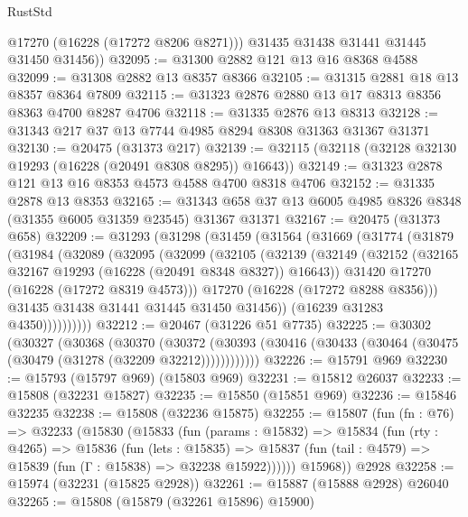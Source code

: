 \begin{lexlean}{RustStd}
\begin{coremodule}
          @17270
          (@16228 (@17272 @8206 @8271)))
        @31435
        @31438
        @31441
        @31445
        @31450
        @31456))
@32095 := @31300 @2882 @121 @13 @16 @8368 @4588
@32099 := @31308 @2882 @13 @8357 @8366
@32105 := @31315 @2881 @18 @13 @8357 @8364 @7809
@32115 := @31323 @2876 @2880 @13 @17 @8313 @8356 @8363 @4700 @8287 @4706
@32118 := @31335 @2876 @13 @8313
@32128 := @31343 @217 @37 @13 @7744 @4985 @8294 @8308 @31363 @31367 @31371
@32130 := @20475 (@31373 @217)
@32139 := @32115 (@32118 (@32128 @32130 @19293 (@16228 (@20491 @8308 @8295)) @16643))
@32149 := @31323 @2878 @121 @13 @16 @8353 @4573 @4588 @4700 @8318 @4706
@32152 := @31335 @2878 @13 @8353
@32165 := @31343 @658 @37 @13 @6005 @4985 @8326 @8348 (@31355 @6005 @31359 @23545) @31367 @31371
@32167 := @20475 (@31373 @658)
@32209 := @31293
    (@31298
      (@31459
        (@31564
          (@31669
            (@31774
              (@31879
                (@31984
                  (@32089
                    (@32095
                      (@32099
                        (@32105
                          (@32139
                            (@32149
                              (@32152 (@32165 @32167 @19293 (@16228 (@20491 @8348 @8327)) @16643))
                              @31420
                              @17270
                              (@16228 (@17272 @8319 @4573)))
                            @17270
                            (@16228 (@17272 @8288 @8356)))
                          @31435
                          @31438
                          @31441
                          @31445
                          @31450
                          @31456))
                      (@16239 @31283 @4350))))))))))
@32212 := @20467 (@31226 @51 @7735)
@32225 := @30302
    (@30327
      (@30368
        (@30370
          (@30372 (@30393 (@30416 (@30433 (@30464 (@30475 (@30479 (@31278 (@32209 @32212))))))))))))
@32226 := @15791 @969
@32230 := @15793 (@15797 @969) (@15803 @969)
@32231 := @15812 @26037
@32233 := @15808 (@32231 @15827)
@32235 := @15850 (@15851 @969)
@32236 := @15846 @32235
@32238 := @15808 (@32236 @15875)
@32255 := @15807
    (fun (fn : @76) =>
    @32233
      (@15830
        (@15833
          (fun (params : @15832) =>
          @15834
            (fun (rty : @4265) =>
            @15836
              (fun (lets : @15835) =>
              @15837 (fun (tail : @4579) => @15839 (fun (Γ : @15838) => @32238 @15922))))))
        @15968))
    @2928
@32258 := @15974 (@32231 (@15825 @2928))
@32261 := @15887 (@15888 @2928) @26040
@32265 := @15808 (@15879 (@32261 @15896) @15900)

\end{coremodule}
\end{lexlean}

